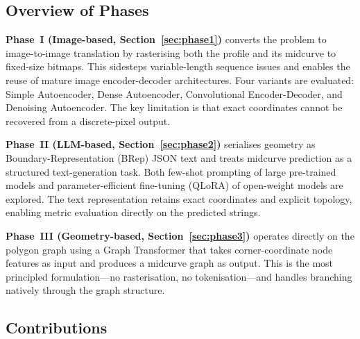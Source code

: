 \documentclass[journal]{IEEEtran}
\begin{document}
\subsection*{Overview of Phases}

\textbf{Phase~I (Image-based, Section~\ref{sec:phase1})} converts the problem
to image-to-image translation by rasterising both the profile and its midcurve
to fixed-size bitmaps.  This sidesteps variable-length sequence issues and
enables the reuse of mature image encoder-decoder architectures.  Four variants
are evaluated: Simple Autoencoder, Dense Autoencoder, Convolutional
Encoder-Decoder, and Denoising Autoencoder.  The key limitation is that exact
coordinates cannot be recovered from a discrete-pixel output.

\textbf{Phase~II (LLM-based, Section~\ref{sec:phase2})} serialises geometry as
Boundary-Representation (BRep) JSON text and treats midcurve prediction as a
structured text-generation task.  Both few-shot prompting of large pre-trained
models and parameter-efficient fine-tuning (QLoRA) of open-weight models are
explored.  The text representation retains exact coordinates and explicit
topology, enabling metric evaluation directly on the predicted strings.

\textbf{Phase~III (Geometry-based, Section~\ref{sec:phase3})} operates
directly on the polygon graph using a Graph Transformer that takes
corner-coordinate node features as input and produces a midcurve graph as
output.  This is the most principled formulation—no rasterisation, no
tokenisation—and handles branching natively through the graph structure.

\subsection*{Contributions}
\end{document}
